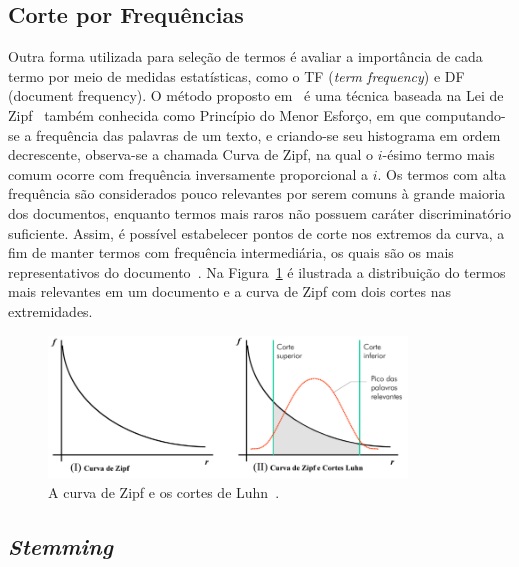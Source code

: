 \subsection*{Corte por Frequências}

Outra forma utilizada para seleção de termos é avaliar a importância de cada termo por meio de medidas estatísticas, como o TF (\textit{term frequency}) e DF (document frequency). O método proposto em~\cite{Luhn1958} é uma técnica baseada na Lei de Zipf~\cite{zipf1932} também conhecida como Princípio do Menor Esforço, em que computando-se a frequência das palavras de um texto, e criando-se seu histograma em ordem decrescente, observa-se a chamada Curva de Zipf, na qual o $i$-ésimo termo mais comum ocorre com frequência inversamente proporcional a $i$. Os termos com alta frequência são considerados pouco relevantes por serem comuns à grande maioria dos documentos, enquanto termos mais raros não possuem caráter discriminatório suficiente. Assim, é possível estabelecer pontos de corte nos extremos da curva, a fim de manter termos com frequência intermediária, os quais são os mais representativos do documento~\cite{Maracini2010}. Na Figura~\ref{fig:luhn} é ilustrada a distribuição do termos mais relevantes em um documento e a curva de Zipf com dois cortes nas extremidades.


  \begin{figure}[!h]
	  \centering
	  \includegraphics[width=0.85\textwidth]{conteudo/capitulos/figs/luhn2.png}
	  \caption{A curva de Zipf e os cortes de Luhn~\cite{Soares2008}.}
	  \label{fig:luhn}
  \end{figure}




\subsection*{\textit{Stemming}}


